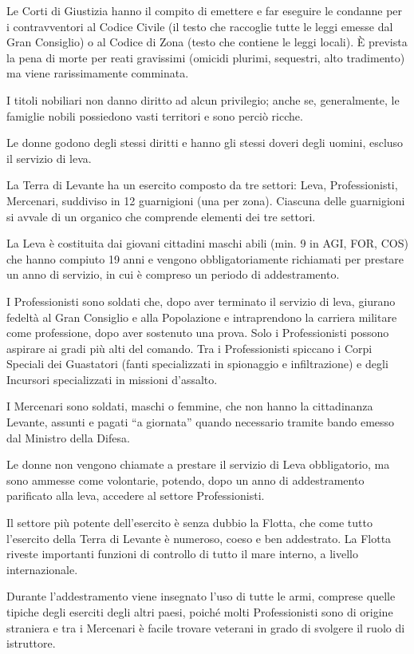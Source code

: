Le Corti di Giustizia hanno il compito di emettere e far eseguire le
condanne per i contravventori al Codice Civile (il testo che raccoglie
tutte le leggi emesse dal Gran Consiglio) o al Codice di Zona (testo
che contiene le leggi locali). \`E prevista la pena di morte per reati
gravissimi (omicidi plurimi, sequestri, alto tradimento) ma viene
rarissimamente comminata.

I titoli nobiliari non danno diritto ad alcun privilegio; anche se,
generalmente, le famiglie nobili possiedono vasti territori e sono
perci\`o ricche.

Le donne godono degli stessi diritti e hanno gli stessi doveri degli
uomini, escluso il servizio di leva.
\fi

\Esercito La Terra di Levante ha un esercito composto da tre settori:
Leva, Professionisti, Mercenari, suddiviso in 12 guarnigioni (una per
zona). Ciascuna delle guarnigioni si avvale di un organico che
comprende elementi dei tre settori.

\iffullversion
La Leva \`e costituita dai giovani cittadini maschi abili (min. 9 in
AGI, FOR, COS) che hanno compiuto 19 anni e vengono obbligatoriamente
richiamati per prestare un anno di servizio, in cui \`e compreso un
periodo di addestramento.

I Professionisti sono soldati che, dopo aver terminato il servizio di
leva, giurano fedelt\`a al Gran Consiglio e alla Popolazione e
intraprendono la carriera militare come professione, dopo aver
sostenuto una prova. Solo i Professionisti possono aspirare ai gradi
pi\`u alti del comando. Tra i Professionisti spiccano i Corpi Speciali
dei Guastatori (fanti specializzati in spionaggio e infiltrazione) e
degli Incursori specializzati in missioni d'assalto.

I Mercenari sono soldati, maschi o femmine, che non hanno la
cittadinanza Levante, assunti e pagati ``a giornata''
quando necessario tramite bando emesso dal Ministro della Difesa.

Le donne non vengono chiamate a prestare il servizio di Leva
obbligatorio, ma sono ammesse come volontarie, potendo, dopo un anno
di addestramento parificato alla leva, accedere al settore
Professionisti.

Il settore pi\`u potente dell'esercito \`e senza dubbio la Flotta, che
come tutto l'esercito della Terra di Levante \`e numeroso, coeso e ben
addestrato. La Flotta riveste importanti funzioni di controllo di
tutto il mare interno, a livello internazionale.

Durante l'addestramento viene insegnato l'uso di tutte le armi,
comprese quelle tipiche degli eserciti degli altri paesi, poich\'e
molti Professionisti sono di origine straniera e tra i Mercenari \`e
facile trovare veterani in grado di svolgere il ruolo di istruttore.


